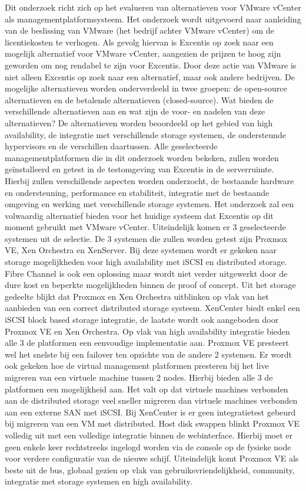 Dit onderzoek richt zich op het evalueren van alternatieven voor VMware vCenter als managementplatformsysteem. Het onderzoek wordt uitgevoerd naar aanleiding van de beslissing van VMware (het bedrijf achter VMware vCenter) om de licentiekosten te verhogen. Als gevolg hiervan is Excentis op zoek naar een mogelijk alternatief voor VMware vCenter, aangezien de prijzen te hoog zijn geworden om nog rendabel te zijn voor Excentis. Door deze actie van VMware is niet alleen Excentis op zoek naar een alternatief, maar ook andere bedrijven.
De mogelijke alternatieven worden onderverdeeld in twee groepen: de open-source alternatieven en de betalende alternatieven (closed-source). Wat bieden de verschillende alternatieven aan en wat zijn de voor- en nadelen van deze alternatieven? De alternatieven worden beoordeeld op het gebied van high availability, de integratie met verschillende storage systemen, de ondersteunde hypervisors en de verschillen daartussen.
Alle geselecteerde managementplatformen die in dit onderzoek worden bekeken, zullen worden geïnstalleerd en getest in de testomgeving van Excentis in de serverruimte. Hierbij zullen verschillende aspecten worden onderzocht, de bestaande hardware en ondersteuning, performance en stabiliteit, integratie met de bestaande omgeving en werking met verschillende storage systemen. Het onderzoek zal een volwaardig alternatief bieden voor het huidige systeem dat Excentis op dit moment gebruikt met VMware vCenter.
Uiteindelijk komen er 3 geselecteerde systemen uit de selectie. De 3 systemen die zullen worden getest zijn Proxmox VE, Xen Orchestra en XenServer.
Bij deze systemen wordt er gekeken naar storage mogelijkheden voor high availability met iSCSI en distributed storage. Fibre Channel is ook een oplossing maar wordt niet verder uitgewerkt door de dure kost en beperkte mogelijkheden binnen de proof of concept.
Uit het storage gedeelte blijkt dat Proxmox en Xen Orchestra uitblinken op vlak van het aanbieden van een correct distributed storage systeem. XenCenter biedt enkel een iSCSI block based storage integratie, de laatste wordt ook aangeboden door Proxmox VE en Xen Orchestra.
Op vlak van high availability integratie bieden alle 3 de platformen een eenvoudige implementatie aan. Proxmox VE presteert wel het snelste bij een failover ten opzichte van de andere 2 systemen.
Er wordt ook gekeken hoe de virtual management platformen presteren bij het live migreren van een virtuele machine tussen 2 nodes. Hierbij bieden alle 3 de platformen een mogelijkheid aan.
Het valt op dat virtuele machines verbonden aan de distributed storage veel sneller migreren dan virtuele machines verbonden aan een externe SAN met iSCSI. Bij XenCenter is er geen integratietest gebeurd bij migreren van een VM met distributed.
Host disk swappen blinkt Proxmox VE volledig uit met een volledige integratie binnen de webinterface. Hierbij moet er geen enkele keer rechtstreeks ingelogd worden via de console op de fysieke node voor verdere configuratie van de nieuwe schijf.
Uiteindelijk komt Proxmox VE als beste uit de bus, globaal gezien op vlak van gebruiksvriendelijkheid, community, integratie met storage systemen en high availability.